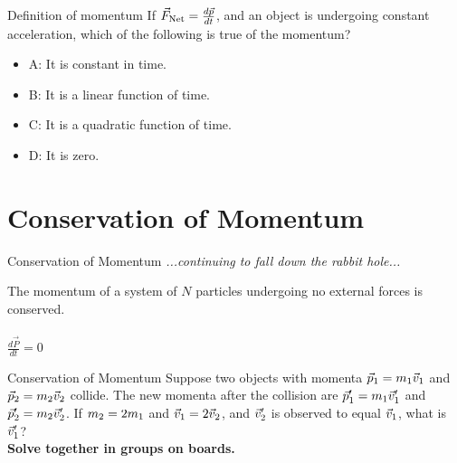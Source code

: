 \documentclass{beamer}
\begin{document}
\begin{frame}{Definition of momentum}
If $\vec{F}_{\rm Net} = \frac{d\vec{p}}{dt}$, and an object is undergoing constant acceleration, which of the following is true of the momentum?
\begin{itemize}
\item A: It is constant in time.
\item B: It is a linear function of time.
\item C: It is a quadratic function of time.
\item D: It is zero.
\end{itemize}
\end{frame}

\section{Conservation of Momentum}

\begin{frame}{Conservation of Momentum}
\textit{...continuing to fall down the rabbit hole...} \\ \vspace{1cm}
\begin{tcolorbox}[colback=white,colframe=red!40!blue,title=Conservation of Momentum]
\alert{The momentum of a system of $N$ particles undergoing no external forces is conserved.} \\ \\
\alert{$\frac{d\vec{P}}{dt}=0$}
\end{tcolorbox}
\end{frame}

\begin{frame}{Conservation of Momentum}
Suppose two objects with momenta $\vec{p}_{\rm 1} = m_{\rm 1}\vec{v}_{\rm 1}$ and $\vec{p}_{\rm 2} = m_{\rm 2}\vec{v}_{\rm 2}$ collide. The new momenta after the collision are $\vec{p}'_{\rm 1} = m_{\rm 1}\vec{v}'_{\rm 1}$ and $\vec{p}'_{\rm 2} = m_{\rm 2}\vec{v}'_{\rm 2}$.  If $m_{\rm 2} = 2 m_{\rm 1}$ and $\vec{v}_{\rm 1} = 2\vec{v}_{\rm 2}$, and $\vec{v}'_{\rm 2}$ is observed to equal $\vec{v}_{\rm 1}$, what is $\vec{v}'_{\rm 1}$? \\ \vspace{1cm}
\textbf{Solve together in groups on boards.}
\end{frame}
\end{document}

